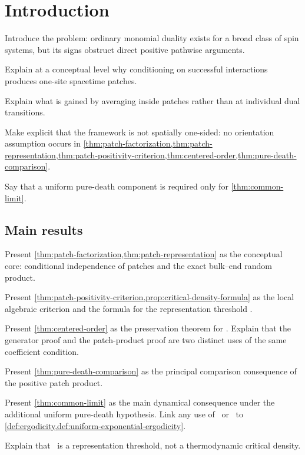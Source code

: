 \section{Introduction}
\label{sec:introduction}

\begin{discussion}
  \item Introduce the problem: ordinary monomial duality exists for a
  broad class of spin systems, but its signs obstruct direct positive
  pathwise arguments.
  \item Explain at a conceptual level why conditioning on successful
  interactions produces one-site spacetime patches.
  \item Explain what is gained by averaging inside patches rather than
  at individual dual transitions.
  \item Make explicit that the framework is not spatially one-sided:
  no orientation assumption occurs in
  \cref{thm:patch-factorization,thm:patch-representation,thm:patch-positivity-criterion,thm:centered-order,thm:pure-death-comparison}.
  \item Say that a uniform pure-death component is required only for
  \cref{thm:common-limit}.
\end{discussion}

\subsection{Main results}

\begin{discussion}
  \item Present \cref{thm:patch-factorization,thm:patch-representation}
  as the conceptual core: conditional independence of patches and the
  exact bulk--end random product.
  \item Present \cref{thm:patch-positivity-criterion,prop:critical-density-formula}
  as the local algebraic criterion and the formula for the representation
  threshold \pstar.
  \item Present \cref{thm:centered-order} as the preservation theorem
  for \Mstar. Explain that the generator proof and the patch-product
  proof are two distinct uses of the same coefficient condition.
  \item Present \cref{thm:pure-death-comparison} as the principal
  comparison consequence of the positive patch product.
  \item Present \cref{thm:common-limit} as the main dynamical
  consequence under the additional uniform pure-death hypothesis.
  Link any use of \ergodicity\ or \uniformexponentialergodicity\ to
  \cref{def:ergodicity,def:uniform-exponential-ergodicity}.
  \item Explain that \pstar\ is a representation threshold, not a
  thermodynamic critical density.
\end{discussion}

